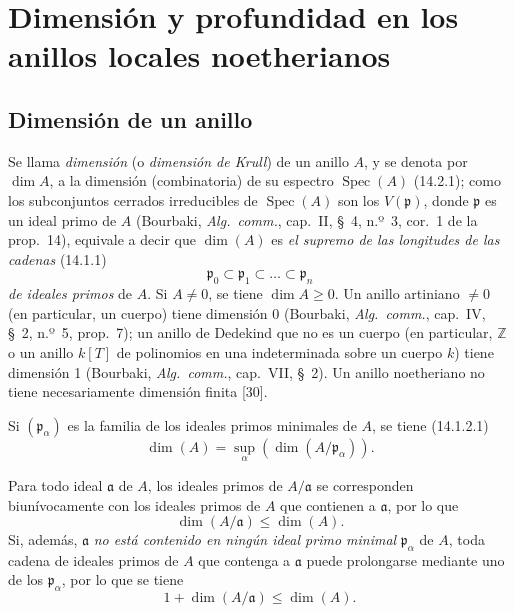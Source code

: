 \section{Dimensión y profundidad en los anillos locales noetherianos}
\label{section:0.16-fr}

\subsection{Dimensión de un anillo}
\label{subsection:0.16.1-fr}

\begin{env}[16.1.1]
\label{0.16.1.1-fr}
Se llama \emph{dimensión} (o \emph{dimensión de Krull}) de un anillo $A$, y se denota por
$\dim A$, a la dimensión (combinatoria) de su espectro
$\operatorname{Spec}(A)$ (14.2.1); como los subconjuntos cerrados irreducibles
de $\operatorname{Spec}(A)$ son los
$V(\mathfrak{p})$, donde $\mathfrak{p}$ es un ideal primo de $A$ (Bourbaki,
\emph{Alg.~comm.}, cap.~II, \S~4, n.º~3, cor.~1 de la prop.~14), equivale a
decir que $\dim(A)$ es \emph{el supremo de las longitudes de las cadenas} (14.1.1)
\[
  \mathfrak{p}_0\subset\mathfrak{p}_1\subset\ldots\subset\mathfrak{p}_n
\]
\emph{de ideales primos} de $A$. Si $A\neq0$, se tiene $\dim A\geq0$. Un anillo
artiniano $\neq0$ (en particular, un cuerpo) tiene dimensión 0 (Bourbaki,
\emph{Alg.~comm.}, cap.~IV, \S~2, n.º~5, prop.~7); un anillo de Dedekind que
no es un cuerpo (en particular, $\mathbb{Z}$ o un anillo $k[T]$ de polinomios
en una indeterminada sobre un cuerpo $k$) tiene dimensión 1 (Bourbaki,
\emph{Alg.~comm.}, cap.~VII, \S~2). Un anillo noetheriano no tiene
necesariamente dimensión finita [30].

Si $(\mathfrak{p}_\alpha)$ es la familia de los ideales primos minimales de
$A$, se tiene (14.1.2.1)
\[
\label{0.16.1.1.1-fr}
  \dim(A)=\sup_\alpha(\dim(A/\mathfrak{p}_\alpha)).
\tag{16.1.1.1}
\]
\end{env}

\begin{env}[16.1.2]
\label{0.16.1.2-fr}
Para todo ideal $\mathfrak{a}$ de $A$, los ideales primos de
$A/\mathfrak{a}$ se corresponden biunívocamente con los ideales primos de $A$
que contienen a $\mathfrak{a}$, por lo que
\[
\label{0.16.1.2.1-fr}
  \dim(A/\mathfrak{a})\leq\dim(A).
\tag{16.1.2.1}
\]
Si, además, $\mathfrak{a}$ \emph{no está contenido en ningún ideal primo minimal}
$\mathfrak{p}_\alpha$ de $A$, toda cadena de ideales primos de $A$ que
contenga a $\mathfrak{a}$ puede prolongarse mediante uno de los
$\mathfrak{p}_\alpha$, por lo que se tiene
\[
\label{0.16.1.2.2-fr}
  1+\dim(A/\mathfrak{a})\leq\dim(A).
\tag{16.1.2.2}
\]
\end{env}


